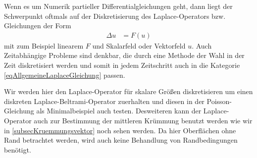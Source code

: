   \begin{ziel}
    Wenn es um Numerik partieller Differentialgleichungen geht, dann liegt der Schwerpunkt oftmals auf der Diskretisierung des Laplace-Operators bzw. Gleichungen der Form
    \begin{align}
      \label{eqAllgemeineLaplaceGleichung}
      \Delta u &= F(u)
    \end{align}
    mit zum Beispiel linearem \( F \) und Skalarfeld oder Vektorfeld \( u \).
    Auch Zeitabhängige Probleme sind denkbar, die durch eine Methode der Wahl in der Zeit diskretisiert werden 
    und somit in jedem Zeitschritt auch in die Kategorie \eqref{eqAllgemeineLaplaceGleichung} passen.

    Wir werden hier den Laplace-Operator für skalare Größen diskretisieren um einen diskreten Laplace-Beltrami-Operator zuerhalten und diesen in der Poisson-Gleichung als Minimalbeispiel
    auch testen. Desweiteren kann der Laplace-Operator auch zur Bestimmung der mittleren Krümmung benutzt werden wie wir in \ref{subsecKruemmungsvektor} noch sehen werden.
    Da hier Oberflächen ohne Rand betrachtet werden, wird auch keine Behandlung von Randbedingungen
    benötigt.
  \end{ziel}

